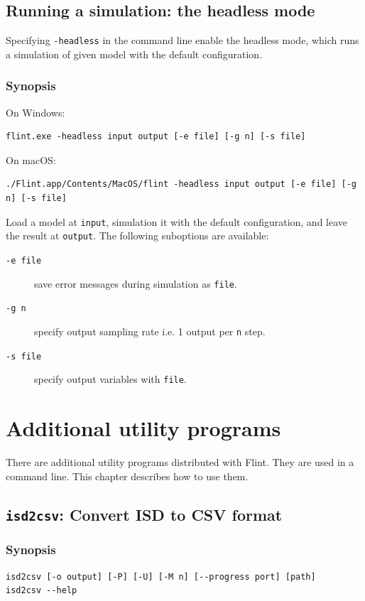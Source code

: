\documentclass[a4paper,10pt]{report}
\begin{document}
\section{Running a simulation: the headless mode}
\label{sec:orgb01e308}
Specifying \texttt{-headless} in the command line enable the headless mode, which
runs a simulation of given model with the default configuration.

\subsection{Synopsis}
\label{sec:orga7e9c69}
On Windows:
\begin{verbatim}
flint.exe -headless input output [-e file] [-g n] [-s file]
\end{verbatim}
On macOS:
\begin{verbatim}
./Flint.app/Contents/MacOS/flint -headless input output [-e file] [-g n] [-s file]
\end{verbatim}
Load a model at \texttt{input}, simulation it with the default configuration,
and leave the result at \texttt{output}.
The following suboptions are available:

\begin{description}
\item[{\texttt{-e file}}] save error messages during simulation as \texttt{file}.
\item[{\texttt{-g n}}] specify output sampling rate i.e. 1 output per \texttt{n} step.
\item[{\texttt{-s file}}] specify output variables with \texttt{file}.
\end{description}

\chapter{Additional utility programs}
\label{sec:org32600fa}
There are additional utility programs distributed with Flint.
They are used in a command line.
This chapter describes how to use them.

\section{\texttt{isd2csv}: Convert ISD to CSV format}
\label{sec:org6595c34}

\subsection{Synopsis}
\label{sec:orgfa6a16b}
\begin{verbatim}
isd2csv [-o output] [-P] [-U] [-M n] [--progress port] [path]
isd2csv --help
\end{verbatim}
\end{document}
